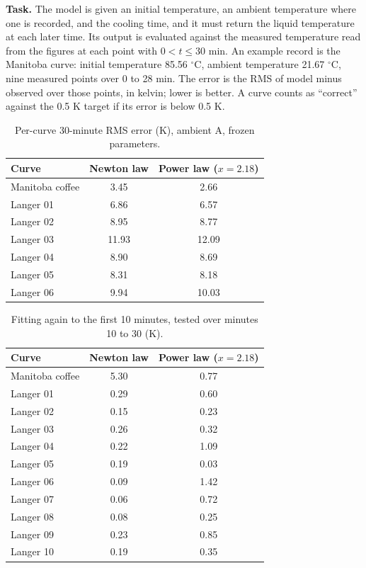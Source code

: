 \documentclass[11pt,letterpaper]{article}
\begin{document}
\textbf{Task.} The model is given an initial temperature, an ambient temperature where one is recorded, and the cooling time, and it must return the liquid temperature at each later time. Its output is evaluated against the measured temperature read from the figures at each point with $0 < t \le 30$ min. An example record is the Manitoba curve: initial temperature 85.56 $^\circ$C, ambient temperature 21.67 $^\circ$C, nine measured points over 0 to 28 min. The error is the RMS of model minus observed over those points, in kelvin; lower is better. A curve counts as ``correct'' against the 0.5 K target if its error is below 0.5 K.

\begin{table}[!htbp]
  \centering
  \caption{Per-curve 30-minute RMS error (K), ambient A, frozen parameters.}
  \label{tab:a2}
  \begin{tabular}{lcc}
    \toprule
    Curve & Newton law & Power law ($x = 2.18$) \\
    \midrule
    Manitoba coffee & 3.45 & 2.66 \\
    Langer 01 & 6.86 & 6.57 \\
    Langer 02 & 8.95 & 8.77 \\
    Langer 03 & 11.93 & 12.09 \\
    Langer 04 & 8.90 & 8.69 \\
    Langer 05 & 8.31 & 8.18 \\
    Langer 06 & 9.94 & 10.03 \\
    \bottomrule
  \end{tabular}
\end{table}

\begin{table}[!htbp]
  \centering
  \caption{Fitting again to the first 10 minutes, tested over minutes 10 to 30 (K).}
  \label{tab:a3}
  \begin{tabular}{lcc}
    \toprule
    Curve & Newton law & Power law ($x = 2.18$) \\
    \midrule
    Manitoba coffee & 5.30 & 0.77 \\
    Langer 01 & 0.29 & 0.60 \\
    Langer 02 & 0.15 & 0.23 \\
    Langer 03 & 0.26 & 0.32 \\
    Langer 04 & 0.22 & 1.09 \\
    Langer 05 & 0.19 & 0.03 \\
    Langer 06 & 0.09 & 1.42 \\
    Langer 07 & 0.06 & 0.72 \\
    Langer 08 & 0.08 & 0.25 \\
    Langer 09 & 0.23 & 0.85 \\
    Langer 10 & 0.19 & 0.35 \\
    \bottomrule
  \end{tabular}
\end{table}
\end{document}
